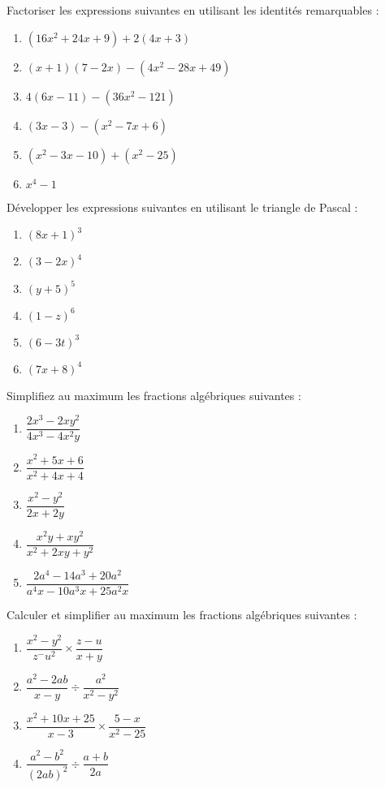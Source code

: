 \medskip
\begin{exercice}[]
Factoriser les expressions suivantes en utilisant les identités remarquables :
\begin{enumerate}
\item $(16x^2+24x+9)+2(4x+3)$
\item $(x+1)(7-2x)-(4x^2-28x+49)$
\item $4(6x-11)-(36x^2-121)$
\item $(3x-3)-(x^2-7x+6)$
\item $(x^2-3x-10)+(x^2-25)$
\item $x^4-1$
\end{enumerate}
\end{exercice}
\medskip
\begin{exercice}[]
Développer les expressions suivantes en utilisant le triangle de Pascal :
\begin{multicols}{2}
\begin{enumerate}
\item $(8x+1)^3$
\item $(3-2x)^4$
\item $(y+5)^5$
\item $(1-z)^6$
\item $(6-3t)^3$
\item $(7x+8)^4$
\end{enumerate}
\end{multicols}
\end{exercice}
\bigskip


\begin{exercice}[]
Simplifiez au maximum les fractions algébriques suivantes :

\begin{enumerate}
\item $\dfrac{2x^3-2xy^2}{4x^3-4x^2y}$
\item $\dfrac{x^2+5x+6}{x^2+4x+4}$
\item $\dfrac{x^2-y^2}{2x+2y}$
\item $\dfrac{x^2y+xy^2}{x^2+2xy+y^2}$
\item $\dfrac{2a^4-14a^3+20a^2}{a^4x-10a^3x+25a^2x}$
\end{enumerate}
\end{exercice}

\begin{exercice}[]
Calculer et simplifier au maximum les fractions algébriques suivantes :
\begin{enumerate}
\item $\dfrac{x^2-y^2}{z^-u^2} \times \dfrac{z-u}{x+y}$
\item $\dfrac{a^2-2ab}{x-y} \div \dfrac{a^2}{x^2-y^2} $
\item $\dfrac{x^2+10x+25}{x-3} \times \dfrac{5-x}{x^2-25}$
\item $\dfrac{a^2-b^2}{(2ab)^2} \div \dfrac{a+b}{2a}$
\end{enumerate}
\end{exercice}

